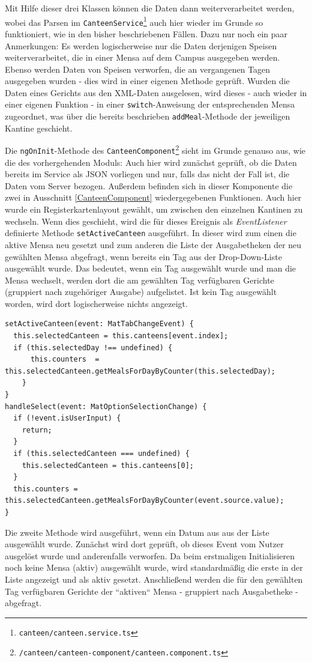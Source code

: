 Mit Hilfe dieser drei Klassen können die Daten dann weiterverarbeitet werden, wobei das Parsen im \texttt{CanteenService}\footnote{\texttt{canteen/canteen.service.ts}} auch hier wieder im Grunde so funktioniert, wie in den bisher beschriebenen Fällen. Dazu nur noch ein paar Anmerkungen: Es werden logischerweise nur die Daten derjenigen Speisen weiterverarbeitet, die in einer Mensa auf dem Campus ausgegeben werden. Ebenso werden Daten von Speisen verworfen, die an vergangenen Tagen ausgegeben wurden - dies wird in einer eigenen Methode geprüft. Wurden die Daten eines Gerichts aus den \acs{XML}-Daten ausgelesen, wird dieses - auch wieder in einer eigenen Funktion - in einer \texttt{switch}-Anweisung der entsprechenden Mensa zugeordnet, was über die bereits beschrieben \texttt{addMeal}-Methode der jeweiligen Kantine geschieht.

Die \texttt{ngOnInit}-Methode des \texttt{CanteenComponent}\footnote{\texttt{/canteen/canteen-component/canteen.component.ts}} sieht im Grunde genauso aus, wie die des vorhergehenden Moduls: Auch hier wird zunächst geprüft, ob die Daten bereits im Service als \acs{JSON} vorliegen und nur, falls das nicht der Fall ist, die Daten vom Server bezogen. Außerdem befinden sich in dieser Komponente die zwei in Ausschnitt \ref{CanteenComponent} wiedergegebenen Funktionen. Auch hier wurde ein Registerkartenlayout gewählt, um zwischen den einzelnen Kantinen zu wechseln. Wenn dies geschieht, wird die für dieses Ereignis als \textit{EventListener} definierte Methode \texttt{setActiveCanteen} ausgeführt. In dieser wird zum einen die aktive Mensa neu gesetzt und zum anderen die Liste der Ausgabetheken der neu gewählten Mensa abgefragt, wenn bereits ein Tag aus der Drop-Down-Liste ausgewählt wurde. Das bedeutet, wenn ein Tag ausgewählt wurde und man die Mensa wechselt, werden dort die am gewählten Tag  verfügbaren Gerichte (gruppiert nach zugehöriger Ausgabe) aufgelistet. Ist kein Tag ausgewählt worden, wird dort logischerweise nichts angezeigt.

\begin{lstlisting}[float, floatplacement=h, style=htmlcssjs, caption={Ausschnitt aus \texttt{CanteenComponent}}, label={CanteenComponent}]
setActiveCanteen(event: MatTabChangeEvent) {
  this.selectedCanteen = this.canteens[event.index];
  if (this.selectedDay !== undefined) {
      this.counters  =  this.selectedCanteen.getMealsForDayByCounter(this.selectedDay);
    }
}
handleSelect(event: MatOptionSelectionChange) {
  if (!event.isUserInput) {
    return;
  }
  if (this.selectedCanteen === undefined) {
    this.selectedCanteen = this.canteens[0];
  }
  this.counters = this.selectedCanteen.getMealsForDayByCounter(event.source.value);
}
\end{lstlisting}
Die zweite Methode wird ausgeführt, wenn ein Datum aus aus der Liste ausgewählt wurde. Zunächst wird dort geprüft, ob dieses Event vom Nutzer ausgelöst wurde und anderenfalls verworfen. Da beim erstmaligen Initialisieren noch keine Mensa (aktiv) ausgewählt wurde, wird standardmäßig die erste in der Liste angezeigt und als aktiv gesetzt. Anschließend werden die für den gewählten Tag verfügbaren Gerichte der ``aktiven`` Mensa - gruppiert nach Ausgabetheke - abgefragt.

